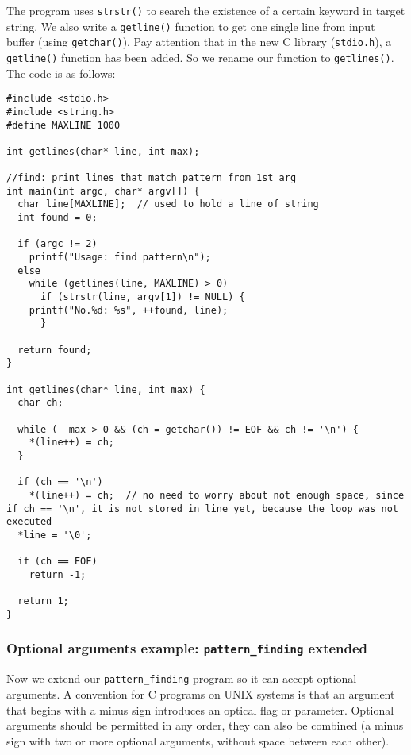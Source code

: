 \documentclass[11pt]{article}
\begin{document}
The program uses \texttt{strstr()} to search the existence of a certain keyword in target string. We also write a \texttt{getline()} function to get one single line from input buffer (using \texttt{getchar()}). Pay attention that in the new C library (\texttt{stdio.h}), a \texttt{getline()} function has been added. So we rename our function to \texttt{getlines()}. The code is as follows:
\begin{verbatim}
#include <stdio.h>
#include <string.h>
#define MAXLINE 1000

int getlines(char* line, int max);

//find: print lines that match pattern from 1st arg 
int main(int argc, char* argv[]) {
  char line[MAXLINE];  // used to hold a line of string
  int found = 0;

  if (argc != 2)
    printf("Usage: find pattern\n");
  else
    while (getlines(line, MAXLINE) > 0)
      if (strstr(line, argv[1]) != NULL) {
	printf("No.%d: %s", ++found, line);
      }

  return found;
}

int getlines(char* line, int max) {
  char ch;

  while (--max > 0 && (ch = getchar()) != EOF && ch != '\n') {
    *(line++) = ch;
  }

  if (ch == '\n')
    *(line++) = ch;  // no need to worry about not enough space, since if ch == '\n', it is not stored in line yet, because the loop was not executed
  *line = '\0';

  if (ch == EOF)
    return -1;

  return 1;
}
\end{verbatim}

\subsubsection{Optional arguments example: \texttt{pattern\_finding} extended}
\label{sec:org647a81f}
Now we extend our \texttt{pattern\_finding} program so it can accept optional arguments. A convention for C programs on UNIX systems is that an argument that begins with a minus sign introduces an optical flag or parameter. Optional arguments should be permitted in any order, they can also be combined (a minus sign with two or more optional arguments, without space between each other).
\end{document}
